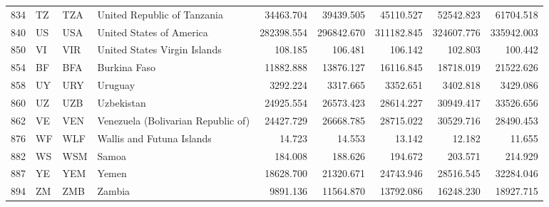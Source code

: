 {\begin{longtable}{rlllrrrrr}
 834 & TZ & TZA & United Republic of Tanzania & 34463.704 & 39439.505 & 45110.527 & 52542.823 & 61704.518 \\
 840 & US & USA & United States of America & 282398.554 & 296842.670 & 311182.845 & 324607.776 & 335942.003 \\
 850 & VI & VIR & United States Virgin Islands & 108.185 & 106.481 & 106.142 & 102.803 & 100.442 \\
 854 & BF & BFA & Burkina Faso & 11882.888 & 13876.127 & 16116.845 & 18718.019 & 21522.626 \\
 858 & UY & URY & Uruguay & 3292.224 & 3317.665 & 3352.651 & 3402.818 & 3429.086 \\
 860 & UZ & UZB & Uzbekistan & 24925.554 & 26573.423 & 28614.227 & 30949.417 & 33526.656 \\
 862 & VE & VEN & Venezuela (Bolivarian Republic of) & 24427.729 & 26668.785 & 28715.022 & 30529.716 & 28490.453 \\
 876 & WF & WLF & Wallis and Futuna Islands & 14.723 & 14.553 & 13.142 & 12.182 & 11.655 \\
 882 & WS & WSM & Samoa & 184.008 & 188.626 & 194.672 & 203.571 & 214.929 \\
 887 & YE & YEM & Yemen & 18628.700 & 21320.671 & 24743.946 & 28516.545 & 32284.046 \\
 894 & ZM & ZMB & Zambia & 9891.136 & 11564.870 & 13792.086 & 16248.230 & 18927.715 \\
\end{longtable}
}